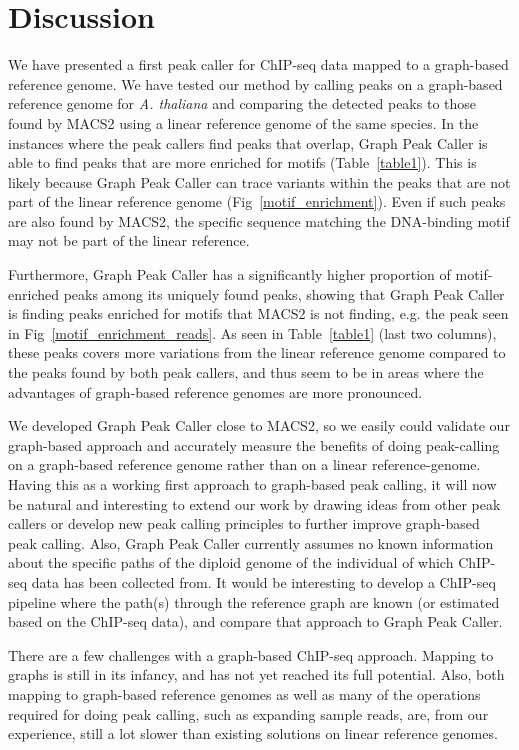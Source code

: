 \documentclass[10pt,letterpaper]{article}
\begin{document}
\section*{Discussion}
We have presented a first peak caller for ChIP-seq data mapped to a graph-based reference genome. We have tested our method by calling peaks on a graph-based reference genome for \emph{A. thaliana} and comparing the detected peaks to those found by MACS2 using a linear reference genome of the same species. In the instances where the peak callers find peaks that overlap, Graph Peak Caller is able to find peaks that are more enriched for motifs (Table~\ref{table1}). This is likely because Graph Peak Caller can trace variants within the peaks that are not part of the linear reference genome (Fig~\ref{motif_enrichment}). Even if such peaks are also found by MACS2, the specific sequence matching the DNA-binding motif may not be part of the linear reference.
	
Furthermore, Graph Peak Caller has a significantly higher proportion of motif-enriched peaks among its uniquely found peaks, showing that Graph Peak Caller is finding peaks enriched for motifs that MACS2 is not finding, e.g. the peak seen in Fig~\ref{motif_enrichment_reads}. As seen in Table~\ref{table1} (last two columns), these peaks covers more variations from the linear reference genome compared to the peaks found by both peak callers, and thus seem to be in areas where the advantages of graph-based reference genomes are more pronounced. 

We developed Graph Peak Caller close to MACS2, so we easily could validate our graph-based approach and accurately measure the benefits of doing peak-calling on a graph-based reference genome rather than on a linear reference-genome. Having this as a working first approach to graph-based peak calling, it will now be natural and interesting  to extend our work by drawing ideas from other peak callers or develop new peak calling principles to further improve graph-based peak calling. Also, Graph Peak Caller currently assumes no known information about the specific paths of the diploid genome of the individual of which ChIP-seq data has been collected from. It would be interesting to develop a ChIP-seq pipeline where the path(s) through the reference graph are known (or estimated based on the ChIP-seq data), and compare that approach to Graph Peak Caller.

There are a few challenges with a graph-based ChIP-seq approach. Mapping to graphs is still in its infancy, and has not yet reached its full potential. Also, both mapping to graph-based reference genomes as well as many of the operations required for doing peak calling, such as expanding sample reads, are, from our experience, still a lot slower than existing solutions on linear reference genomes. 
\end{document}
